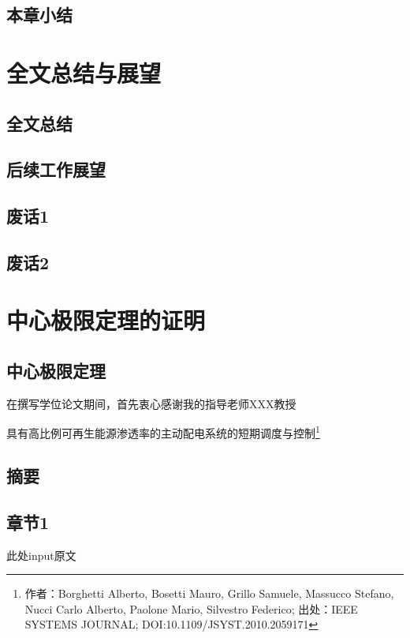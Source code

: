\documentclass[bachelor]{NCEPU-thesis}
\begin{document}
\section{本章小结}

\blindtext

\chapter{全文总结与展望}

\section{全文总结}

\section{后续工作展望}

\section{废话1}

\section{废话2}





\nocite{*}


\thesisappendix

\chapter{中心极限定理的证明}

\section{中心极限定理}

\thesisacknowledgement
在撰写学位论文期间，首先衷心感谢我的指导老师XXX教授





\thesistranslationchinese
\begin{center}
\LARGE 具有高比例可再生能源渗透率的主动配电系统的短期调度与控制\footnote{作者：Borghetti Alberto, Bosetti Mauro, Grillo Samuele, Massucco Stefano, Nucci Carlo Alberto, Paolone Mario, Silvestro Federico; 出处：IEEE SYSTEMS JOURNAL; DOI:10.1109/JSYST.2010.2059171}

\end{center}

\section{摘要}

\section{章节1}



\thesistranslationoriginal

此处input原文


\cleardoublepage
\end{document}
